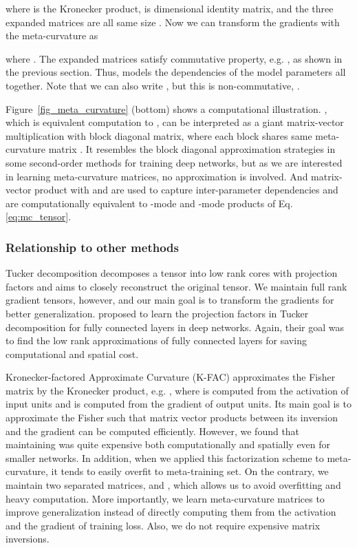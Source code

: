 \documentclass{article}
\begin{document}
where  is the Kronecker product,  is  dimensional identity matrix, and the three expanded matrices are all same size . Now we can transform the gradients with the meta-curvature as

where . The expanded matrices satisfy commutative property, e.g. , as shown in the previous section. Thus,  models the dependencies of the model parameters all together. Note that we can also write , but this is non-commutative, .

Figure~\ref{fig_meta_curvature} (bottom) shows a computational illustration. , which is equivalent computation to , can be interpreted as a giant matrix-vector multiplication with block diagonal matrix, where each block shares same meta-curvature matrix . It resembles the block diagonal approximation strategies in some second-order methods for training deep networks, but as we are interested in learning meta-curvature matrices, no approximation is involved. And matrix-vector product with  and  are used to capture inter-parameter dependencies and are computationally equivalent to -mode and -mode products of Eq. \ref{eq:mc_tensor}.

\subsubsection{Relationship to other methods}
Tucker decomposition \cite{KoBa09} decomposes a tensor into low rank cores with projection factors and aims to closely reconstruct the original tensor. We maintain full rank gradient tensors, however, and our main goal is to transform the gradients for better generalization. \cite{Kossaif-arxiv-2018} proposed to learn the projection factors in Tucker decomposition for fully connected layers in deep networks. Again, their goal was to find the low rank approximations of fully connected layers for saving computational and spatial cost.

Kronecker-factored Approximate Curvature (K-FAC) \cite{Martens-icml-2015,Grosse-icml-2016} approximates the Fisher matrix by the Kronecker product, e.g. , where  is computed from the activation of input units and  is computed from the gradient of output units. Its main goal is to approximate the Fisher such that matrix vector products between its inversion and the gradient can be computed efficiently. However, we found that maintaining  was quite expensive both computationally and spatially even for smaller networks. In addition, when we applied this factorization scheme to meta-curvature, it tends to easily overfit to meta-training set. On the contrary, we maintain two separated matrices,  and , which allows us to avoid overfitting and heavy computation. More importantly, we learn meta-curvature matrices to improve generalization instead of directly computing them from the activation and the gradient of training loss. Also, we do not require expensive matrix inversions.
\end{document}
